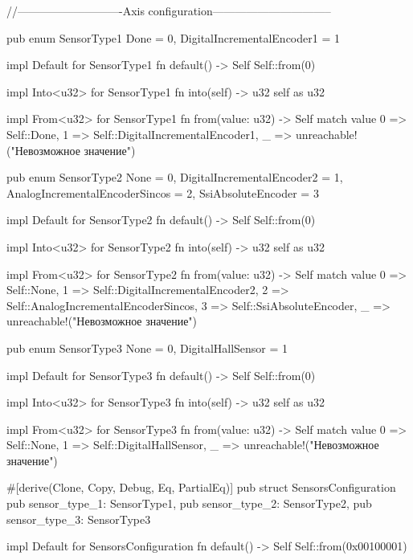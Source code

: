 \documentclass[a4paper,12pt]{article}
\begin{document}
\begin{appendices}
\begin{flushleft}
\begin{MyCodes}
//----------------------------Axis configuration--------------------------------

pub enum SensorType1 {
    Done = 0,
    DigitalIncrementalEncoder1 = 1
}

impl Default for SensorType1 {
    fn default() -> Self {
        Self::from(0)
    }
}

impl Into<u32> for SensorType1 {
    fn into(self) -> u32 {
        self as u32
    }
}

impl From<u32> for SensorType1 {
    fn from(value: u32) -> Self {
        match value {
            0 => Self::Done,
            1 => Self::DigitalIncrementalEncoder1,
            _ => unreachable!("Невозможное значение")
        }
    }
}

pub enum SensorType2 {
    None = 0,
    DigitalIncrementalEncoder2 = 1,
    AnalogIncrementalEncoderSincos = 2,
    SsiAbsoluteEncoder = 3
}

impl Default for SensorType2 {
    fn default() -> Self {
        Self::from(0)
    }
}

impl Into<u32> for SensorType2 {
    fn into(self) -> u32 {
        self as u32
    }
}

impl From<u32> for SensorType2 {
    fn from(value: u32) -> Self {
        match value {
            0 => Self::None,
            1 => Self::DigitalIncrementalEncoder2,
            2 => Self::AnalogIncrementalEncoderSincos,
            3 => Self::SsiAbsoluteEncoder,
            _ => unreachable!("Невозможное значение")
        }
    }
}

pub enum SensorType3 {
    None = 0,
    DigitalHallSensor = 1
}

impl Default for SensorType3 {
    fn default() -> Self {
        Self::from(0)
    }
}

impl Into<u32> for SensorType3 {
    fn into(self) -> u32 {
        self as u32
    }
}

impl From<u32> for SensorType3 {
    fn from(value: u32) -> Self {
        match value {
            0 => Self::None,
            1 => Self::DigitalHallSensor,
            _ => unreachable!("Невозможное значение")
        }
    }
}

#[derive(Clone, Copy, Debug, Eq, PartialEq)]
pub struct SensorsConfiguration {
    pub sensor_type_1: SensorType1,
    pub sensor_type_2: SensorType2,
    pub sensor_type_3: SensorType3
}

impl Default for SensorsConfiguration {
    fn default() -> Self {
        Self::from(0x00100001)
    }
}


\end{MyCodes}
\end{flushleft}
\end{appendices}
\end{document}
